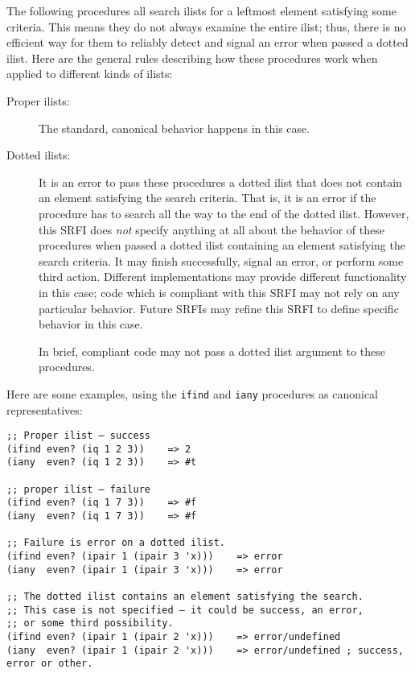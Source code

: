 The following procedures all search ilists for a leftmost element
satisfying some criteria. This means they do not always examine the
entire ilist; thus, there is no efficient way for them to reliably
detect and signal an error when passed a dotted ilist. Here are the
general rules describing how these procedures work when applied to
different kinds of ilists:

\begin{description}
\item[ Proper ilists: ]
The standard, canonical behavior happens in this case.
\item[ Dotted ilists: ]
It is an error to pass these procedures a dotted ilist that does not
contain an element satisfying the search criteria. That is, it is an
error if the procedure has to search all the way to the end of the
dotted ilist. However, this SRFI does \emph{not} specify anything at all
about the behavior of these procedures when passed a dotted ilist
containing an element satisfying the search criteria. It may finish
successfully, signal an error, or perform some third action. Different
implementations may provide different functionality in this case; code
which is compliant with this SRFI may not rely on any particular
behavior. Future SRFIs may refine this SRFI to define specific behavior
in this case.

In brief, compliant code may not pass a dotted ilist argument to these
procedures.
\end{description}

Here are some examples, using the \texttt{ifind} and \texttt{iany}
procedures as canonical representatives:

\begin{verbatim}
;; Proper ilist — success
(ifind even? (iq 1 2 3))    => 2
(iany  even? (iq 1 2 3))    => #t

;; proper ilist — failure
(ifind even? (iq 1 7 3))    => #f
(iany  even? (iq 1 7 3))    => #f

;; Failure is error on a dotted ilist.
(ifind even? (ipair 1 (ipair 3 'x)))    => error
(iany  even? (ipair 1 (ipair 3 'x)))    => error

;; The dotted ilist contains an element satisfying the search.
;; This case is not specified — it could be success, an error, 
;; or some third possibility.
(ifind even? (ipair 1 (ipair 2 'x)))    => error/undefined
(iany  even? (ipair 1 (ipair 2 'x)))    => error/undefined ; success, error or other.
\end{verbatim}

